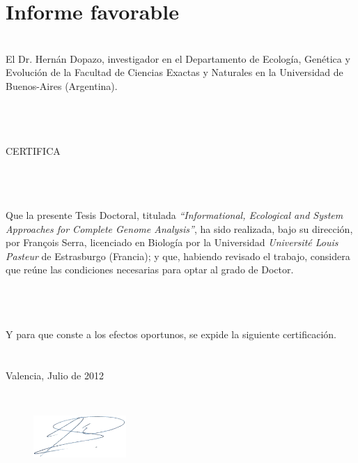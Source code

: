 

\chapter*{Informe favorable}
\thispagestyle{empty}

\verb| |\\

El Dr. Hernán Dopazo, investigador en el Departamento de Ecología, Genética y Evolución de la Facultad de Ciencias Exactas y Naturales en la Universidad de Buenos-Aires (Argentina).

\verb| |\\
\verb| |\\
\verb| |\\


CERTIFICA

\verb| |\\
\verb| |\\
\verb| |\\

Que la presente Tesis Doctoral, titulada \textit{``Informational, Ecological and System Approaches for Complete Genome Analysis''}, ha sido realizada, bajo su dirección, por François Serra, licenciado en Biología por la Universidad \textit{Université Louis Pasteur} de Estrasburgo (Francia); y que, habiendo revisado el trabajo, considera que reúne las condiciones necesarias para optar al grado de Doctor.

\verb| |\\
\verb| |\\
\verb| |\\
Y para que conste a los efectos oportunos, se expide la siguiente certificación.
\verb| |\\
\verb| |\\
\verb| |\\
Valencia, Julio de 2012

\verb| |\\

\begin{figure}[!hb]
  \hspace{200pt}\includegraphics[width=100pt]{figures/other/firma_H.png}
\end{figure}


